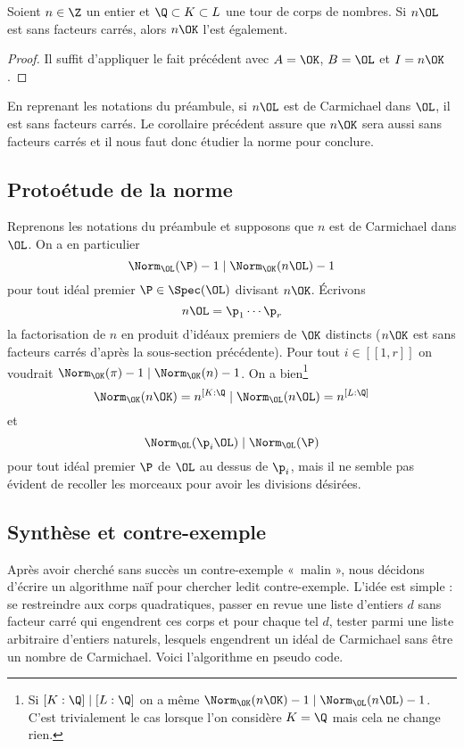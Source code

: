 \documentclass[a4paper, 12pt, oneside]{article}
\begin{document}
\begin{corollaire}Soient $n\in \Z$ un entier et $\Q\subset K\subset L$ une tour de corps de nombres. Si $n\OL$ est sans facteurs carrés, alors $n\OK$ l'est également.
\end{corollaire}

\begin{proof}Il suffit d'appliquer le fait précédent avec $A=\OK$, $B=\OL$ et $I = n\OK$.
\end{proof}

En reprenant les notations du préambule, si $n\OL$ est de Carmichael dans $\OL$, il est sans facteurs carrés. Le corollaire précédent assure que $n\OK$ sera aussi sans facteurs carrés et il nous faut donc étudier la norme pour conclure.

\subsection{Protoétude de la norme}

Reprenons les notations du préambule et supposons que $n$ est de Carmichael dans $\OL$. On a en particulier $$\Norm_\OL(\P) - 1 \mid \Norm_\OK(n\OL) - 1$$ pour tout idéal premier $\P\in \Spec(\OL)$ divisant $n\OK$. Écrivons $$n\OL = \p_1\cdots \p_r$$ la factorisation de $n$ en produit d'idéaux premiers de $\OK$ distincts ($n\OK$ est sans facteurs carrés d'après la sous-section précédente). Pour tout $i\in [\![1, r]\!]$ on voudrait $\Norm_\OK(\pi) - 1\mid \Norm_\OK(n) - 1$. On a bien\footnote{Si $[K : \Q]\mid [L:\Q]$ on a même $\Norm_\OK(n\OK) - 1\mid \Norm_\OL(n\OL) - 1$. C'est trivialement le cas lorsque l'on considère $K=\Q$ mais cela ne change rien.} $$\Norm_\OK(n\OK) = n^{[K : \Q} \mid \Norm_\OL(n\OL) = n^{[L : \Q]}$$ et $$\Norm_\OL(\p_i \OL) \mid \Norm_\OL(\P)$$ pour tout idéal premier $\P$ de $\OL$ au dessus de $\p_i$, mais il ne semble pas évident de recoller les morceaux pour avoir les divisions désirées.


\subsection{Synthèse et contre-exemple}

Après avoir cherché sans succès un contre-exemple « malin », nous décidons d'écrire un algorithme naïf pour chercher ledit contre-exemple. L'idée est simple : se restreindre aux corps quadratiques, passer en revue une liste d'entiers $d$ sans facteur carré qui engendrent ces corps et pour chaque tel $d$, tester parmi une liste arbitraire d'entiers naturels, lesquels engendrent un idéal de Carmichael sans être un nombre de Carmichael. Voici l'algorithme en pseudo code. \\
\end{document}
